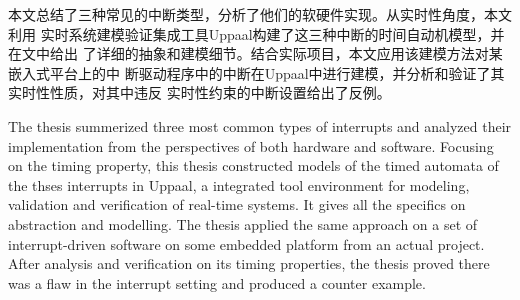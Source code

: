 
\makeatletter
\ifthu@bachelor\relax\else
  \ifthu@doctor
  \else
    \ifthu@master
    \fi
  \fi
\fi
\makeatother





\begin{cabstract}
   本文总结了三种常见的中断类型，分析了他们的软硬件实现。从实时性角度，本文利用
   实时系统建模验证集成工具Uppaal构建了这三种中断的时间自动机模型，并在文中给出
   了详细的抽象和建模细节。结合实际项目，本文应用该建模方法对某嵌入式平台上的中
   断驱动程序中的中断在Uppaal中进行建模，并分析和验证了其实时性性质，对其中违反
   实时性约束的中断设置给出了反例。
\end{cabstract}


\begin{eabstract} 
   The thesis summerized three most common types of interrupts and analyzed
   their implementation from the perspectives of both hardware and software.
   Focusing on the timing property, this thesis constructed models of the 
   timed automata of the thses interrupts in Uppaal, a integrated tool 
   environment for modeling, validation and verification of real-time systems.
   It gives all the specifics on abstraction and modelling. The thesis applied
   the same approach on a set of interrupt-driven software on some embedded
   platform from an actual project. After analysis and verification on its
   timing properties, the thesis proved there was a flaw in the interrupt
   setting and produced a counter example.
\end{eabstract}

